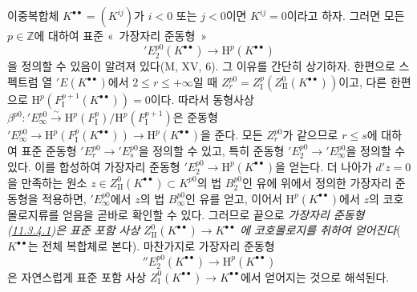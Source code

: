 \begin{env}[11.3.4]
\label{0.11.3.4-fr}
이중복합체 $K^{\bullet\bullet}=(K^{ij})$가 $i<0$ 또는 $j<0$이면
$K^{ij}=0$이라고 하자. 그러면 모든 $p\in\mathbb Z$에 대하여 표준
«~가장자리 준동형~»
\[
\label{0.11.3.4.1-fr}
  'E_2^{p0}(K^{\bullet\bullet})\longrightarrow
  \mathrm H^p(K^{\bullet\bullet})
  \tag{11.3.4.1}
\]
을 정의할 수 있음이 알려져 있다(M, XV, 6). 그 이유를 간단히 상기하자.
한편으로 스펙트럼 열 $'E(K^{\bullet\bullet})$에서
$2\leq r\leq+\infty$일 때
$Z_r^{p0}=Z_{\mathrm I}^p(Z_{\mathrm{II}}^0(K^{\bullet\bullet}))$이고,
다른 한편으로
$\mathrm H^p(F_{\mathrm I}^{p+1}(K^{\bullet\bullet}))=0$이다. 따라서
동형사상
$\beta^{p0}:'E_\infty^{p0}\xrightarrow{\sim}
\mathrm H^p(F_{\mathrm I}^p)/\mathrm H^p(F_{\mathrm I}^{p+1})$은
준동형
$'E_\infty^{p0}\to\mathrm H^p(F_{\mathrm I}^p(K^{\bullet\bullet}))
\to\mathrm H^p(K^{\bullet\bullet})$을 준다. 모든 $Z_r^{p0}$가 같으므로
$r\leq s$에 대하여 표준 준동형
$'E_r^{p0}\to'E_s^{p0}$을 정의할 수 있고, 특히 준동형
$'E_2^{p0}\to'E_\infty^{p0}$을 정의할 수 있다. 이를 합성하여 가장자리
준동형 $'E_2^{p0}\to\mathrm H^p(K^{\bullet\bullet})$을 얻는다. 더 나아가
$d'z=0$을 만족하는 원소
$z\in Z_{\mathrm{II}}^0(K^{\bullet\bullet})\subset K^{p0}$의
법 $B_2^{p0}$인 유에 위에서 정의한 가장자리 준동형을 적용하면,
$'E_\infty^{p0}$에서 $z$의 법 $B_\infty^{p0}$인 유를 얻고, 이어서
$\mathrm H^p(K^{\bullet\bullet})$에서 $z$의 코호몰로지류를 얻음을 곧바로
확인할 수 있다. 그러므로 끝으로 \emph{가장자리 준동형
(\hyperref[0.11.3.4.1-fr]{11.3.4.1})은 표준 포함 사상}
$Z_{\mathrm{II}}^0(K^{\bullet\bullet})\to K^{\bullet\bullet}$
\emph{에 코호몰로지를 취하여 얻어진다}($K^{\bullet\bullet}$는 전체
복합체로 본다). 마찬가지로 가장자리 준동형
\[
\label{0.11.3.4.2-fr}
  ''E_2^{p0}(K^{\bullet\bullet})\longrightarrow
  \mathrm H^p(K^{\bullet\bullet})
  \tag{11.3.4.2}
\]
은 자연스럽게 표준 포함 사상
$Z_{\mathrm I}^0(K^{\bullet\bullet})\to K^{\bullet\bullet}$에서
얻어지는 것으로 해석된다.
\end{env}


